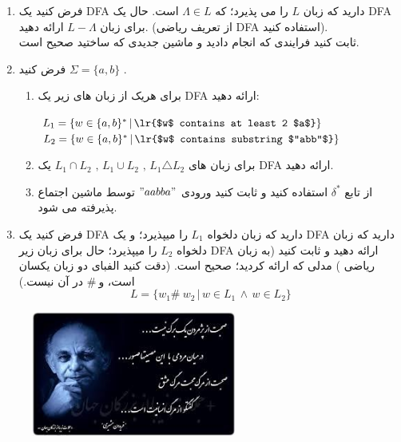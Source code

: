 \documentclass{article}
\begin{document}
	\begin{enumerate}
		\item 
		فرض کنید یک DFA دارید که زبان $L$ را می پذیرد؛ که	
		$\Lambda \in L $
		 است. حال یک DFA برای زبان 
		 $ L-\Lambda $
		  ارائه دهید. (از تعریف ریاضی DFA استفاده کنید).
		  \\
		  ثابت کنید فرایندی که انجام دادید و ماشین جدیدی که ساختید صحیح است.
		\item 
		فرض کنید $\Sigma = \{a, b \}$
		.
		\begin{enumerate}
			\item 
			برای هریک از زبان های زیر یک DFA ارائه دهید:
			
			\begin{flushleft}
				$L_1 = \{w \in \{a,b\}^* \, | \, \text{\lr{$w$ contains at least 2 $a$}} \} $
				\\
				$L_2 = \{w \in \{a,b\}^* \, | \, \text{\lr{$w$ contains substring $"abb"$}} \} $
			\end{flushleft}
		
			\item 
			برای زبان های  
			$L_1 \cap L_2 \text{ , } L_1 \cup L_2 \text{ , } L_1 \triangle L_2$
			یک DFA ارائه دهید.
			\item 
			از تابع 
			$\delta^*$
			استفاده کنید و ثابت کنید ورودی $"aabba"$ 
			توسط ماشین اجتماع پذیرفته می شود.			
		\end{enumerate}
	

		\item 
		فرض کنید یک DFA دارید که زبان دلخواه $L_1 $ را میپذیرد؛
		 و یک DFA دارید که زبان دلخواه $L_2 $ را میپذیرد؛
		  حال برای زبان زیر DFA ارائه دهید و ثابت کنید
		  (به زبان ریاضی ) مدلی که ارائه کردید؛ صحیح است.
		   (دقت کنید الفبای دو زبان یکسان است، و$\#\ $ در آن نیست.)
		   	$$L = \{ w_1 \#\ w_2 \, | \, w  \in L_1 \, \land \, w \in L_2 \}$$
		
	\end{enumerate}
	
	\begin{figure}[h]
		\centering
		\includegraphics[width=0.6\textwidth]{image}
	\end{figure}
\end{document}
